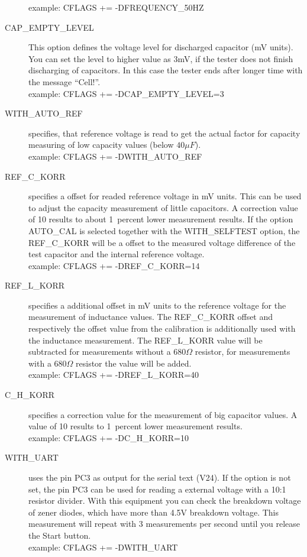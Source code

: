 \begin{description}
example: CFLAGS += -DFREQUENCY\_50HZ
  \item[CAP\_EMPTY\_LEVEL]  This option defines the voltage level for discharged capacitor (mV units).
You can set the level to higher value as 3mV, if the tester does not finish discharging of capacitors.
In this case the tester ends after longer time with the message ``Cell!''.\\
example: CFLAGS += -DCAP\_EMPTY\_LEVEL=3
  \item[WITH\_AUTO\_REF] specifies, that reference voltage is read to get the actual factor for capacity measuring of low capacity values (below \(40\mu F\)).\\
example:  CFLAGS += -DWITH\_AUTO\_REF
  \item[REF\_C\_KORR] specifies a offset for readed reference voltage in mV units.
This can be used to adjust the capacity measurement of little capacitors.
A correction value of 10 results to about 1~percent lower measurement results.
If the option AUTO\_CAL is selected together with the WITH\_SELFTEST option, the REF\_C\_KORR will be
a offset to the measured voltage difference of the test capacitor and the internal reference voltage.\\
example:  CFLAGS += -DREF\_C\_KORR=14
  \item[REF\_L\_KORR] specifies a additional offset in mV units to the reference voltage for the measurement of
inductance values. 
The REF\_C\_KORR offset and respectively the offset value from the calibration is additionally used with the inductance measurement.
The REF\_L\_KORR value will be subtracted for measurements without a \(680 \Omega\) resistor,
for measurements with a \(680 \Omega\) resistor the value will be added.\\
example: CFLAGS += -DREF\_L\_KORR=40
  \item[C\_H\_KORR] specifies a correction value for the measurement of big capacitor values.
A value of 10 results to 1~percent lower measurement results.\\
example:  CFLAGS += -DC\_H\_KORR=10
  \item[WITH\_UART] uses the pin PC3 as output for the serial text (V24).
If the option is not set, the pin PC3 can be used for reading a external voltage with a 10:1 resistor divider.
With this equipment you can check the breakdown voltage of zener diodes, which have more than 4.5V breakdown voltage.
This measurement will repeat with 3 measurements per second until you release the Start button.\\
example: CFLAGS += -DWITH\_UART

\end{description}
